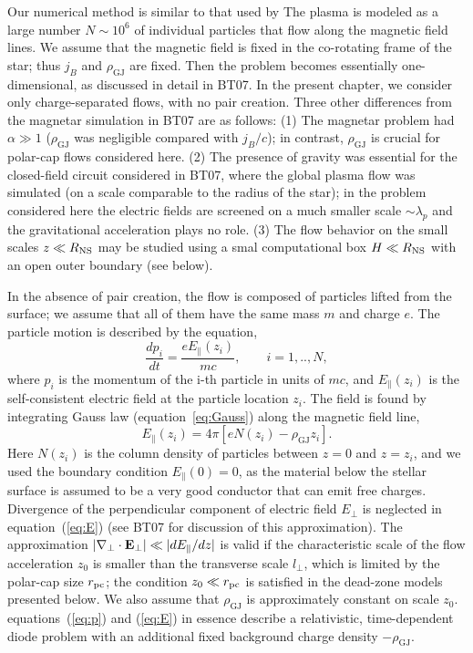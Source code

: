 Our numerical method is similar to that used by
\citet[hereafter BT07]{beloborodov_corona_2007}
The plasma is modeled as a large number $N\sim 10^6$ of individual
particles that flow along the magnetic field lines.
We assume that the magnetic field is fixed in
the co-rotating frame of the star; thus $j_B$ and $\rho_\mathrm{GJ}$ are fixed. Then the
problem becomes essentially one-dimensional, as discussed in detail in BT07.
In the present chapter, we consider only charge-separated flows, with no pair creation.
Three other differences from the magnetar simulation in BT07 are as follows:
(1) The magnetar problem had $\alpha\gg 1$
($\rho_\mathrm{GJ}$ was negligible compared with $j_B/c$);
in contrast, $\rho_\mathrm{GJ}$ is crucial for polar-cap flows considered here.
(2) The presence of gravity was essential for the closed-field circuit considered
in BT07, where the global plasma flow was simulated (on a scale comparable to
the radius of the star); in the problem considered here the electric fields are
screened on a much smaller scale $\sim \lambda_p$ and the gravitational
acceleration plays no role.
(3) The flow behavior on the small scales $z\ll R_{\rm NS}$ may be studied using
a smal computational box $H\ll R_{\rm NS}$ with an open outer boundary (see below).

In the absence of pair creation, the flow is composed of particles lifted from
the surface; we assume that all of them have the same mass $m$ and charge $e$.
 The particle motion is described by the equation,
\begin{equation}
\label{eq:p}
    \frac{dp_i}{dt} = \frac{eE_\parallel(z_i)}{mc},   \qquad i=1,..,N,
\end{equation}
where $p_i$ is the momentum of the i-th particle in units of $mc$, and
$E_\parallel(z_i)$ is the self-consistent electric field at the particle location $z_i$.
The field is found by integrating Gauss law (equation~\ref{eq:Gauss})
along the magnetic field line,
\begin{equation}
 \label{eq:E}
   E_\parallel(z_i) = 4\pi \left[ eN(z_i) - \rho_\mathrm{GJ} z_i \right].
\end{equation}
Here $N(z_i)$ is the column density of particles between $z=0$ and $z=z_i$,
and we used the boundary condition $E_\parallel(0)=0$, as the material below the
stellar surface is assumed to be a very good conductor that can emit free charges.
Divergence of the perpendicular component of electric field $E_\perp$
is neglected in equation~(\ref{eq:E}) (see BT07 for discussion of this approximation).
The approximation $|\nabla_\perp\cdot{\mathbf E}_\perp|\ll |dE_\parallel/dz|$ is valid if the
characteristic scale of the flow acceleration $z_0$ is smaller than the transverse
scale $l_\perp$, which is limited by the polar-cap size $r_{\rm pc}$;
the condition $z_0\ll r_{\rm pc}$ is satisfied in the dead-zone models presented below.
We also assume that $\rho_\mathrm{GJ}$ is approximately constant on scale $z_0$.
equations~(\ref{eq:p}) and (\ref{eq:E}) in essence describe a relativistic, time-dependent
diode problem with an additional fixed background charge density $-\rho_\mathrm{GJ}$.

